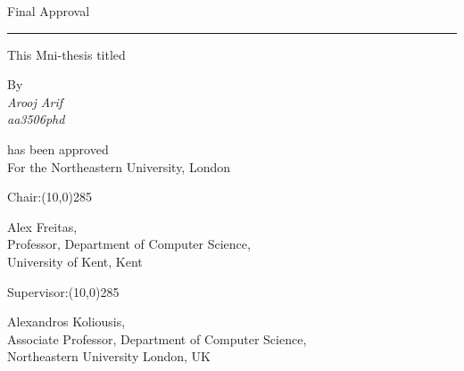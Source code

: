 
\begin{center}

\Large Final Approval
\end{center}
\noindent\rule{15.5cm}{3pt}

\begin{center}
\normalsize
 This Mni-thesis titled\\
\end{center}


\begin{center}
\large {}
\end{center}

\vfill
\begin{center}
By\\
\emph{Arooj Arif\\
aa3506phd}
\end{center}


\begin{center}\normalsize
has been approved\\
For the Northeastern University, London
\end{center}

%


\vfill
\normalsize
Chair:\line(10,0){285}
\vspace{-0.50cm}
\begin{center}\normalsize
    Alex Freitas,\\
    Professor, Department of Computer Science,\\
    University of Kent, Kent\\

\end{center}

\vfill
\normalsize
Supervisor:\line(10,0){285}
\vspace{-0.50cm}
\begin{center}\normalsize
Alexandros Koliousis,\\
Associate Professor, Department of Computer Science,\\
Northeastern University London, UK
\end{center}

